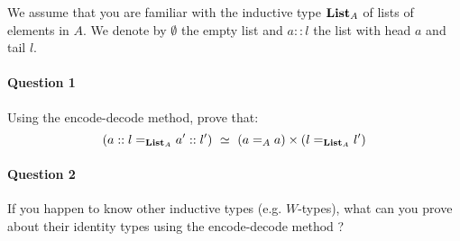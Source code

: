 \documentclass{article}[6pt]%
\newcommand{\List}{\mathrm{\bf List}}
\begin{document}
\begin{Exercise}[title={Types of lists, and more},difficulty=1]
We assume that you are familiar with the inductive type $\List_A$ of lists of elements in $A$. We denote by $\emptyset$ the empty list and $a::l$ the list with head $a$ and tail $l$. 

\paragraph{Question 1} Using the encode-decode method, prove that:
\[(a::l =_{\List_A} a'::l') \ \simeq \ (a=_Aa)\times (l=_{\List_A}l')\]

\paragraph{Question 2} If you happen to know other inductive types (e.g. $W$-types), what can you prove about their identity types using the encode-decode method ?
\end{Exercise}



\end{document}

